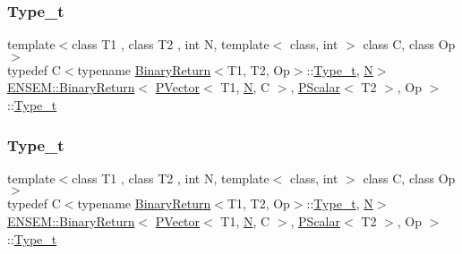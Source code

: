 \subsubsection{\texorpdfstring{Type\_t}{Type\_t}\hspace{0.1cm}{\footnotesize\ttfamily [1/2]}}
{\footnotesize\ttfamily template$<$class T1 , class T2 , int N, template$<$ class, int $>$ class C, class Op $>$ \\
typedef C$<$typename \mbox{\hyperlink{structENSEM_1_1BinaryReturn}{Binary\+Return}}$<$T1, T2, Op$>$\+::\mbox{\hyperlink{structENSEM_1_1BinaryReturn_3_01PVector_3_01T1_00_01N_00_01C_01_4_00_01PScalar_3_01T2_01_4_00_01Op_01_4_a0d5062c0e1f923bbacd25fb473e379b5}{Type\+\_\+t}}, \mbox{\hyperlink{operator__name__util_8cc_a7722c8ecbb62d99aee7ce68b1752f337}{N}}$>$ \mbox{\hyperlink{structENSEM_1_1BinaryReturn}{E\+N\+S\+E\+M\+::\+Binary\+Return}}$<$ \mbox{\hyperlink{classENSEM_1_1PVector}{P\+Vector}}$<$ T1, \mbox{\hyperlink{operator__name__util_8cc_a7722c8ecbb62d99aee7ce68b1752f337}{N}}, C $>$, \mbox{\hyperlink{classENSEM_1_1PScalar}{P\+Scalar}}$<$ T2 $>$, Op $>$\+::\mbox{\hyperlink{structENSEM_1_1BinaryReturn_3_01PVector_3_01T1_00_01N_00_01C_01_4_00_01PScalar_3_01T2_01_4_00_01Op_01_4_a0d5062c0e1f923bbacd25fb473e379b5}{Type\+\_\+t}}}

\mbox{\label{structENSEM_1_1BinaryReturn_3_01PVector_3_01T1_00_01N_00_01C_01_4_00_01PScalar_3_01T2_01_4_00_01Op_01_4_a0d5062c0e1f923bbacd25fb473e379b5}} 
\subsubsection{\texorpdfstring{Type\_t}{Type\_t}\hspace{0.1cm}{\footnotesize\ttfamily [2/2]}}
{\footnotesize\ttfamily template$<$class T1 , class T2 , int N, template$<$ class, int $>$ class C, class Op $>$ \\
typedef C$<$typename \mbox{\hyperlink{structENSEM_1_1BinaryReturn}{Binary\+Return}}$<$T1, T2, Op$>$\+::\mbox{\hyperlink{structENSEM_1_1BinaryReturn_3_01PVector_3_01T1_00_01N_00_01C_01_4_00_01PScalar_3_01T2_01_4_00_01Op_01_4_a0d5062c0e1f923bbacd25fb473e379b5}{Type\+\_\+t}}, \mbox{\hyperlink{operator__name__util_8cc_a7722c8ecbb62d99aee7ce68b1752f337}{N}}$>$ \mbox{\hyperlink{structENSEM_1_1BinaryReturn}{E\+N\+S\+E\+M\+::\+Binary\+Return}}$<$ \mbox{\hyperlink{classENSEM_1_1PVector}{P\+Vector}}$<$ T1, \mbox{\hyperlink{operator__name__util_8cc_a7722c8ecbb62d99aee7ce68b1752f337}{N}}, C $>$, \mbox{\hyperlink{classENSEM_1_1PScalar}{P\+Scalar}}$<$ T2 $>$, Op $>$\+::\mbox{\hyperlink{structENSEM_1_1BinaryReturn_3_01PVector_3_01T1_00_01N_00_01C_01_4_00_01PScalar_3_01T2_01_4_00_01Op_01_4_a0d5062c0e1f923bbacd25fb473e379b5}{Type\+\_\+t}}}




